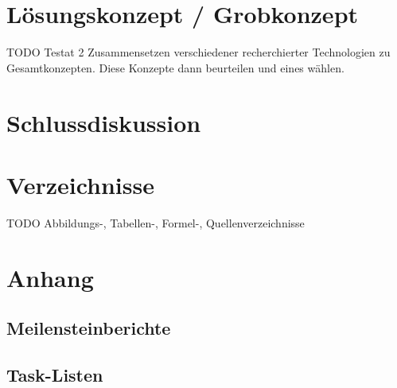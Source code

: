 \documentclass[a4paper]{report}
\begin{document}
\vspace{1em}
\noindent



\chapter{Lösungskonzept / Grobkonzept}
TODO Testat 2
Zusammensetzen verschiedener recherchierter Technologien zu Gesamtkonzepten. Diese Konzepte dann beurteilen und eines wählen. 

\chapter{Schlussdiskussion}

\chapter{Verzeichnisse}
TODO Abbildungs-, Tabellen-, Formel-, Quellenverzeichnisse
\printbibliography

\chapter{Anhang}
\section{Meilensteinberichte}

\section{Task-Listen}
\end{document}
